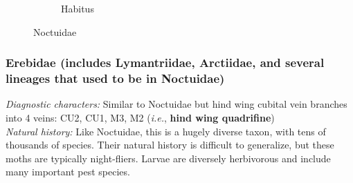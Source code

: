 \documentclass[letterpaper, 11pt]{article}
\begin{document}
\begin{figure}[ht!]
\begin{subfigure}[ht!]{0.37\textwidth}
        \caption{Habitus}
        \label{fig:noctuid2}
    \end{subfigure}
    \caption{Noctuidae}\label{fig:noctuids}
\end{figure}

\subsubsection{Erebidae (includes Lymantriidae, Arctiidae, and several lineages that used to be in Noctuidae)}
\noindent{}\textit{Diagnostic characters:} Similar to Noctuidae but hind wing cubital vein branches into 4 veins: CU2, CU1, M3, M2 (\textit{i.e.}, \textbf{hind wing quadrifine})\\

\noindent{}\textit{Natural history:} Like Noctuidae, this is a hugely diverse taxon, with tens of thousands of species. Their natural history is difficult to generalize, but these moths are typically night-fliers. Larvae are diversely herbivorous and include many important pest species.
\end{document}

